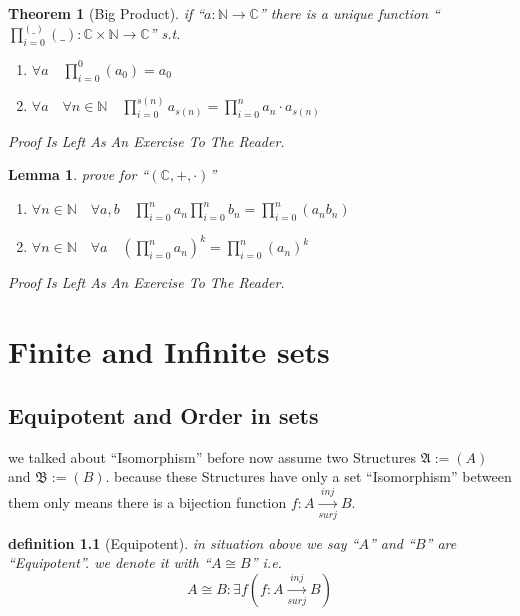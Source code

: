 \documentclass[10pt,a4paper]{book}
\newtheorem{definition}{definition}[section]
\newtheorem{theorem}{Theorem}[section]
\newtheorem{lemma}{Lemma}[section]
\begin{document}
\begin{theorem}[Big Product] if ``$a : \mathbb{N} \to \mathbb{C}$'' there is a unique function ``$\prod_{i = 0}^{(\_)} (\_)  :\mathbb{C} \times \mathbb{N} \to \mathbb{C}$'' s.t.

    \begin{enumerate}
        \setlength{\itemsep}{0pt} %
        \item       $\forall a \quad  \prod_{i = 0}^0 (a_0)  = a_0$
        \item       $\forall a \quad \forall n \in \mathbb{N} \quad  \prod_{i = 0}^{s(n)} a_{s(n)} = \prod_{i = 0}^n a_n \cdot a_{s(n)}  $
    \end{enumerate}
    Proof Is Left As An Exercise To The Reader.
\end{theorem}

\begin{lemma}prove for ``$(\mathbb{C} , + , \cdot  )$''
    \begin{enumerate}
        \setlength{\itemsep}{0pt} %
        \item       $\forall n   \in \mathbb{N} \quad \forall a , b   \quad  \prod_{i = 0}^n a_n  \prod_{i = 0}^n b_n = \prod_{i = 0}^n (a_n  b_n )  $
        \item       $\forall n   \in \mathbb{N} \quad \forall a   \quad  (\prod_{i = 0}^n a_n)^k = \prod_{i = 0}^n (a_n)^k $
    \end{enumerate}
    Proof Is Left As An Exercise To The Reader.
\end{lemma}

\chapter{Finite and Infinite sets}

\section{Equipotent and Order in sets}

we talked about ``Isomorphism'' before now assume two Structures $\mathfrak{A}
    := (A)$ and $\mathfrak{B} := (B)$. because these Structures have only a set
``Isomorphism'' between them only means there is a bijection function $f:A
    \xrightarrow[surj]{inj} B $.

\begin{definition}
    [Equipotent]
    in  situation above we say ``$A$'' and ``$B$'' are ``Equipotent''.  we denote it with ``$A \cong B$'' i.e.
    \[ A \cong B : \exists f  (f:A \xrightarrow[surj]{inj} B) \]
\end{definition}
\end{document}
